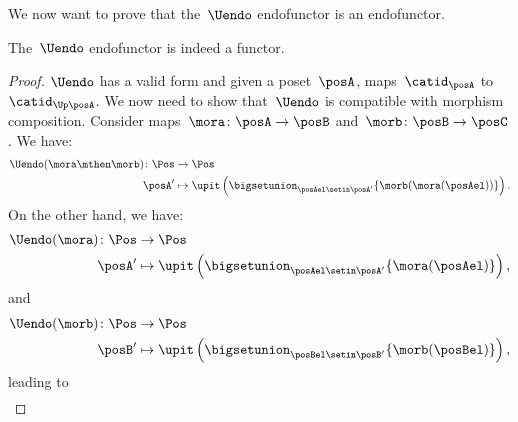 We now want to prove that the~$\Uendo$ endofunctor is an endofunctor.

\begin{lemma}
    \label{lem:Uendo-is-functor}
    The~$\Uendo$ endofunctor is indeed a functor.
\end{lemma}

\begin{proof}
    $\Uendo$ has a valid form and given a poset~$\posA$, maps~$\catid_\posA$ to~$\catid_{\Up \posA}$.
    We now need to show that~$\Uendo$ is compatible with morphism composition.
    Consider maps~$\mora\colon \posA \to \posB$ and~$\morb\colon \posB \to \posC$.
    We have:
    \begin{equation}
        \label{eq:ufunctor_1}
        \begin{aligned}
            \Uendo(\mora\mthen \morb)\colon \Pos & \to \Pos \\
            \posA'                               & \mapsto \upit \left( \bigsetunion_{\posAel\setin \posA'} \{\morb(\mora(\posAel))\}\right).
        \end{aligned}
    \end{equation}
    On the other hand, we have:
    \begin{equation}
        \begin{aligned}
            \Uendo(\mora)\colon \Pos & \to \Pos \\
            \posA'                   & \mapsto \upit \left( \bigsetunion_{\posAel\setin \posA'}\{\mora(\posAel)\}\right),
        \end{aligned}
    \end{equation}
    and
    \begin{equation}
        \begin{aligned}
            \Uendo(\morb)\colon \Pos & \to \Pos \\
            \posB'                   & \mapsto \upit \left( \bigsetunion_{\posBel\setin \posB'}\{\morb(\posBel)\}\right),
        \end{aligned}
    \end{equation}
    leading to
    \begin{equation}
        \label{eq:ufunctor_2}
        \begin{aligned}

\end{aligned}
\end{equation}
\end{proof}

